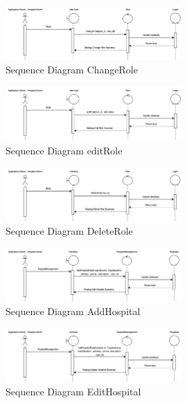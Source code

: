     \begin{figure}[h]
    \centering
    \includegraphics[width=0.6\textwidth]{Sequence 8.3.png}
    \caption{Sequence Diagram ChangeRole}
    \end{figure}

    \begin{figure}[h]
    \centering
    \includegraphics[width=0.6\textwidth]{Sequence 8.4.png}
    \caption{Sequence Diagram editRole}
    \end{figure}

    \begin{figure}[h]
    \centering
    \includegraphics[width=0.6\textwidth]{Sequence 8.5.png}
    \caption{Sequence Diagram DeleteRole}
    \end{figure}


\begin{figure}[h]
    \centering
    \includegraphics[width=0.6\textwidth]{Sequence 9.1.png}
    \caption{Sequence Diagram AddHospital}
    \end{figure}

    \begin{figure}[h]
    \centering
    \includegraphics[width=0.6\textwidth]{Sequence 9.2.png}
    \caption{Sequence Diagram EditHospital}
    \end{figure}

